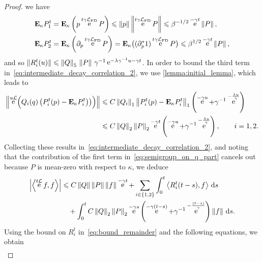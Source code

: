 \documentclass[11pt,a4paper]{article}
\DeclareMathOperator{\e}{e}
\newcommand{\expect}[0]{\mathbf{E}}
\renewcommand{\d}{\mathrm d}
\theoremstyle{plain}
\numberwithin{equation}{section}
\renewcommand{\leq}{\leqslant}
\begin{document}
\begin{proof}
    we have
    \begin{align*}
        \expect_{\kappa} P^t_1 &= \expect_{\kappa} \left( p \e^{t \gamma \mathcal L_{\rm FD}} P\right)
        \leq \norm{p} \norm{\e^{t \gamma \mathcal L_{\rm FD}} P} \leq \beta^{-1/2} \e^{- \gamma t} \norm{P}, \\
        \expect_{\kappa} P^t_2 &= \expect_{\kappa} \left( \partial_p \e^{t \gamma \mathcal L_{\rm FD}} P\right)
        = \expect_{\kappa} \bigl((\partial_p^*1) \e^{t \gamma \mathcal L_{\rm FD}} P\bigr) \leq \beta^{1/2} \e^{-\gamma t} \norm{P},
    \end{align*}
    and so $\norm{R_i^t(u)} \leq \norm{Q}_5 \, \norm{P} \,\gamma^{-1} \e^{-\lambda \gamma^{-1} u - \gamma t}$.
    In order to bound the third term in~\eqref{eq:intermediate_decay_correlation_2},
    we use \cref{lemma:initial_lemma},
    which leads to
    \begin{align*}
        \norm{\e^{u \mathcal L} \Bigl( Q_i(q) \, \bigl(P^t_i(p) - \expect_\kappa P^t_i\bigr) \bigr) \Bigr)}
        &\leq C \norm{Q_i}_1 \norm{P^t_i(p) - \expect_\kappa P^t_i}_1 \left(\e^{-\gamma u} + \gamma^{-1} \e^{-\frac{\lambda u}{\gamma}} \right) \\
        &\leq C \norm{Q}_2 \norm{P}_2 \e^{-\gamma t}\left(\e^{-\gamma u} + \gamma^{-1} \e^{-\frac{\lambda u}{\gamma}} \right),
        \qquad i = 1, 2.
    \end{align*}
    Collecting these results in~\eqref{eq:intermediate_decay_correlation_2},
    and noting that the contribution of the first term in~\eqref{eq:semigroup_on_q_part} cancels out because $P$ is mean-zero with respect to $\kappa$,
    we deduce
    \begin{align*}
        \label{eq:intermediate_decay_correlation_3}
        \abs{ \ip{\e^{t \mathcal L} f}{f} }
        &\leq C \norm{Q} \norm{P} \norm{f} \e^{-\gamma t}
        + \sum_{i\in\{1,2\}} \int_{0}^t \ip{R^t_i(t-s)}{f} \, \d s \\
        &\quad + \int_{0}^t C \norm{Q}_2 \norm{P}_2 \e^{-\gamma s}\left(\e^{-\gamma (t-s)} + \gamma^{-1} \e^{-\frac{(t-s)}{\gamma}} \right) \norm{f} \, \d s.
    \end{align*}
    Using the bound on $R_i^t$ in~\eqref{eq:bound_remainder} and the following equations,
    we obtain
    \begin{align*}

\end{align*}
\end{proof}
\end{document}
